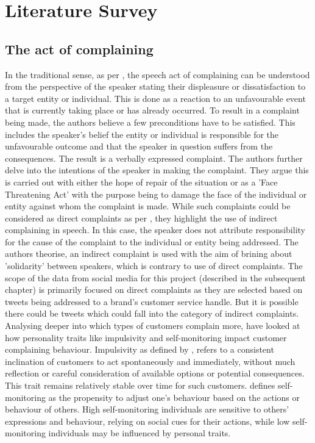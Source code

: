 \chapter{Literature Survey}

\section{The act of complaining}

In the traditional sense, as per \cite{olshtain_speechact_1987}, the speech act of complaining can be understood from the perspective of the speaker stating their displeasure or dissatisfaction to a target entity or individual. This is done as a reaction to an unfavourable event that is currently taking place or has already occurred. To result in a complaint being made, the authors believe a few preconditions have to be satisfied. This includes the speaker's belief the entity or individual is responsible for the unfavourable outcome and that the speaker in question suffers from the consequences. The result is a verbally expressed complaint. 
The authors further delve into the intentions of the speaker in making the complaint. They argue this is carried out with either the hope of repair of the situation or as a 'Face Threatening Act' with the purpose being to damage the face of the individual or entity against whom the complaint is made.
\newline \newline
While such complaints could be considered as direct complaints as per \cite{boxerSocialDistanceSpeech1993}, they highlight the use of indirect complaining in speech. In this case, the speaker does not attribute responsibility for the cause of the complaint to the individual or entity being addressed. The authors theorise, an indirect complaint is used with the aim of brining about 'solidarity' between speakers, which is contrary to use of direct complaints. The scope of the data from social media for this project (described in the subsequent chapter) is primarily focused on direct complaints as they are selected based on tweets being addressed to a brand's customer service handle. But it is possible there could be tweets which could fall into the category of indirect complaints.
\newline \newline
Analysing deeper into which types of customers complain more, \cite{sharma_complainers_2010} have looked at how personality traits like impulsivity and self-monitoring impact customer complaining behaviour. Impulsivity as defined by \cite{rookNormativeInfluencesImpulsive1995}, refers to a consistent inclination of customers to act spontaneously and immediately,  without much reflection or careful consideration of available options or potential consequences. This trait remains relatively stable over time for such customers. \cite{bechererSelfMonitoringModeratingVariable1978} defines self-monitoring as the propensity to adjust one's behaviour based on the actions or behaviour of others. High self-monitoring individuals are sensitive to others' expressions and behaviour, relying on social cues for their actions, while low self-monitoring individuals may be influenced by personal traits. 
